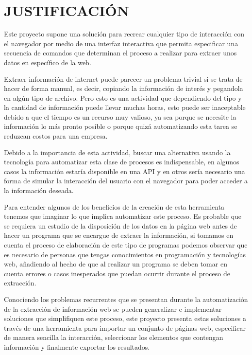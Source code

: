 \documentclass[12pt]{report}
\begin{document}
\break


\section[Justificación]{JUSTIFICACIÓN}

Este proyecto supone una solución para recrear cualquier tipo de interacción con el navegador por medio de una interfaz interactiva que permita especificar una secuencia de comandos que determinan el proceso a realizar para extraer unos datos en específico de la web.

Extraer información de internet puede parecer un problema trivial si se trata de hacer de forma manual, es decir, copiando la información de interés y pegandola en algún tipo de archivo. Pero esto es una actividad que dependiendo del tipo y la cantidad de información puede llevar muchas horas, esto puede ser inaceptable debido a que el tiempo es un recurso muy valioso, ya sea porque se necesite la información lo más pronto posible o porque quizá automatizando esta tarea se reduzcan costos para una empresa. 

Debido a la importancia de esta actividad, buscar una alternativa usando la tecnología para automatizar esta clase de procesos es indispensable, en algunos casos la información estaría disponible en una API y en otros sería necesario una forma de simular la interacción del usuario con el navegador para poder acceder a la información deseada.

Para entender algunos de los beneficios de la creación de esta herramienta tenemos que imaginar lo que implica automatizar este proceso. Es probable que se requiera un estudio de la disposición de los datos en la página web antes de hacer un programa que se encargue de extraer la información, si tomamos en cuenta el proceso de elaboración de este tipo de programas podemos observar que es necesario de personas que tengas conocimientos en programación y tecnologías web, añadiendo al hecho de que al realizar un programa se deben tomar en cuenta errores o casos inesperados que puedan ocurrir durante el proceso de extracción. 

Conociendo los problemas recurrentes que se presentan durante la automatización de la extracción de información web se pueden generalizar e implementar soluciones que simplifiquen este proceso, este proyecto presenta estas soluciones a través de una herramienta para importar un conjunto de páginas web, especificar de manera sencilla la interacción, seleccionar los elementos que contengan información y finalmente exportar los resultados.
\end{document}
